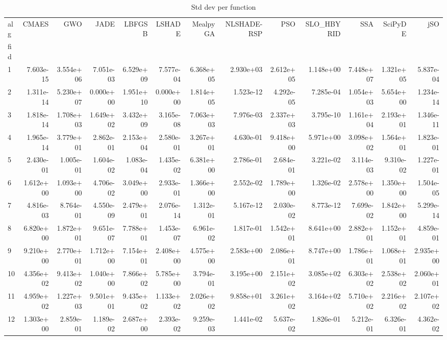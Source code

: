 \begin{table}
\caption{Std dev per function}
\label{tab:std_all}
\begin{tabular}{lrrrrrrrrrrrr}
\toprule
alg & CMAES & GWO & JADE & LBFGSB & LSHADE & MealpyGA & NLSHADE-RSP & PSO & SLO_HBYRID & SSA & SciPyDE & jSO \\
fid &  &  &  &  &  &  &  &  &  &  &  &  \\
\midrule
1 & 7.603e-15 & 3.554e+06 & 7.051e-03 & 6.529e+09 & 7.577e-04 & 6.368e+05 & 2.930e+03 & 2.612e+05 & 1.148e+00 & 7.448e+07 & 1.321e+05 & 5.837e-04 \\
2 & 1.311e-14 & 5.230e+07 & 0.000e+00 & 1.951e+10 & 0.000e+00 & 1.814e+05 & 1.523e-12 & 4.292e-05 & 7.285e-04 & 1.054e+03 & 5.654e+00 & 1.234e-14 \\
3 & 1.818e-14 & 1.708e+03 & 1.649e+02 & 3.432e+09 & 3.165e-08 & 7.063e+03 & 7.976e-03 & 2.337e+03 & 3.795e-10 & 1.161e+04 & 2.193e+01 & 1.346e-11 \\
4 & 1.965e-14 & 3.779e+01 & 2.862e-01 & 2.153e+04 & 2.580e-01 & 3.267e+01 & 4.630e-01 & 9.418e+00 & 5.971e+00 & 3.098e+02 & 1.564e+01 & 1.823e-01 \\
5 & 2.430e-01 & 1.005e-01 & 1.604e-02 & 1.083e-04 & 1.435e-02 & 6.381e+00 & 2.786e-01 & 2.684e-01 & 3.221e-02 & 3.114e-03 & 9.310e-02 & 1.227e-01 \\
6 & 1.612e+00 & 1.093e+00 & 4.706e-02 & 3.049e+00 & 2.933e-01 & 1.366e+00 & 2.552e-02 & 1.789e+00 & 1.326e-02 & 2.578e+00 & 1.350e+00 & 1.504e-05 \\
7 & 4.816e-03 & 8.764e-01 & 4.550e-09 & 2.479e+01 & 2.076e-14 & 1.312e-01 & 5.167e-12 & 2.030e-02 & 8.773e-12 & 7.699e-02 & 1.842e+00 & 5.299e-14 \\
8 & 6.820e+00 & 1.872e+01 & 9.651e-07 & 7.788e+01 & 1.453e-07 & 6.961e-02 & 1.817e-01 & 1.542e+01 & 8.641e+00 & 2.882e+01 & 1.152e+01 & 4.859e-01 \\
9 & 9.210e+00 & 2.770e+01 & 1.712e+00 & 7.154e+01 & 2.408e+00 & 4.575e+00 & 2.583e+00 & 2.086e+01 & 8.747e+00 & 1.786e+01 & 1.068e+01 & 2.935e+00 \\
10 & 4.356e+02 & 9.413e+02 & 1.040e+00 & 7.866e+02 & 5.785e+00 & 3.794e-01 & 3.195e+00 & 2.151e+02 & 3.085e+02 & 6.303e+02 & 2.538e+02 & 2.060e+01 \\
11 & 4.959e+02 & 1.227e+03 & 9.501e+01 & 9.435e+02 & 1.133e+02 & 2.026e+02 & 9.858e+01 & 3.261e+02 & 3.164e+02 & 5.710e+02 & 2.216e+02 & 2.107e+02 \\
12 & 1.303e+00 & 2.859e-01 & 1.189e-02 & 2.687e+00 & 2.393e-02 & 9.259e-03 & 1.441e-02 & 5.637e-02 & 1.826e-01 & 5.212e-01 & 6.326e-01 & 4.362e-02 \\

\end{tabular}
\end{table}
